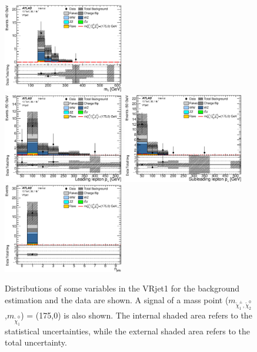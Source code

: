 \begin{figure}[htbp]
\includegraphics[width=0.47\textwidth]{data/plot/VR/all_Mt_VRjet1.eps} \\
\includegraphics[width=0.47\textwidth]{data/plot/VR/all_PtLep_VRjet1.eps}
\includegraphics[width=0.47\textwidth]{data/plot/VR/all_PtSublep_VRjet1.eps} \\
\includegraphics[width=0.47\textwidth]{data/plot/VR/all_Njets_VRjet1.eps}
\caption{Distributions of some variables in the VRjet1 for the background estimation and the data are shown. A signal of a mass point ($m_{\tilde{\chi}_1^\pm , \tilde{\chi}_2^0}$,$m_{\tilde{\chi}_1^0}$) = (175,0) is also shown. The internal shaded area refers to the statistical uncertainties, while the external shaded area refers to the total uncertainty.}
\label{fig:VRjet1_plot}
\end{figure}

